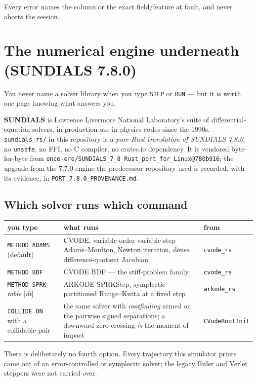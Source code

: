 \documentclass[11pt]{article}
\newcommand{\kw}[1]{\texttt{\uppercase{#1}}}
\newcommand{\code}[1]{\texttt{#1}}
\begin{document}
Every error names the column or the exact field/feature at fault, and
never aborts the session.

\section{The numerical engine underneath (SUNDIALS 7.8.0)}

You never name a solver library when you type \kw{step} or \kw{run} ---
but it is worth one page knowing what answers you.

\textbf{SUNDIALS} is Lawrence Livermore National Laboratory's suite of
differential-equation solvers, in production use in physics codes since
the 1990s. \code{sundials\_rs/} in this repository is a \emph{pure-Rust
translation of SUNDIALS 7.8.0}: no \code{unsafe}, no FFI, no C compiler,
no crates.io dependency. It is vendored byte-for-byte from
\code{once-ere/SUNDIALS\_7\_8\_Rust\_port\_for\_Linux@780b916}; the
upgrade from the 7.7.0 engine the predecessor repository used is
recorded, with its evidence, in \code{PORT\_7.8.0\_PROVENANCE.md}.

\subsection{Which solver runs which command}

\begin{center}
\begin{tabular}{p{4.6cm}p{7.4cm}p{2.2cm}}
\textbf{you type} & \textbf{what runs} & \textbf{from}\\\hline
\kw{method adams} (default) & CVODE, variable-order variable-step
Adams--Moulton, Newton iteration, dense difference-quotient Jacobian &
\code{cvode\_rs}\\
\kw{method bdf} & CVODE BDF --- the stiff-problem family &
\code{cvode\_rs}\\
\kw{method sprk} \emph{table} [\emph{dt}] & ARKODE SPRKStep, symplectic
partitioned Runge--Kutta at a fixed step & \code{arkode\_rs}\\
\kw{collide on} with a collidable pair & the same solver with
\emph{rootfinding} armed on the pairwise signed separations; a downward
zero crossing \emph{is} the moment of impact &
\code{CVodeRootInit}\\
\end{tabular}
\end{center}

There is deliberately no fourth option. Every trajectory this simulator
prints came out of an error-controlled or symplectic solver; the legacy
Euler and Verlet steppers were not carried over.
\end{document}
